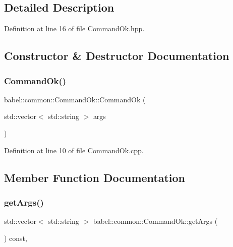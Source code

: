 \subsection{Detailed Description}


Definition at line 16 of file Command\+Ok.\+hpp.



\subsection{Constructor \& Destructor Documentation}
\mbox{\label{classbabel_1_1common_1_1_command_ok_a57b55058fd0267e7665b417337c3d93e}} 
\subsubsection{\texorpdfstring{Command\+Ok()}{CommandOk()}}
{\footnotesize\ttfamily babel\+::common\+::\+Command\+Ok\+::\+Command\+Ok (\begin{DoxyParamCaption}\item[{std\+::vector$<$ std\+::string $>$}]{args }\end{DoxyParamCaption})}



Definition at line 10 of file Command\+Ok.\+cpp.



\subsection{Member Function Documentation}
\mbox{\label{classbabel_1_1common_1_1_command_ok_a50c500fb74111c9e3b0b90a53fedc003}} 
\subsubsection{\texorpdfstring{get\+Args()}{getArgs()}}
{\footnotesize\ttfamily std\+::vector$<$ std\+::string $>$ babel\+::common\+::\+Command\+Ok\+::get\+Args (\begin{DoxyParamCaption}{ }\end{DoxyParamCaption}) const\hspace{0.3cm}{\ttfamily [override]}, {\ttfamily [virtual]}}



